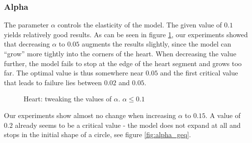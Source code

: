 \subsubsection{Alpha}

The parameter $\alpha$ controls the elasticity of the model. The given value of $0.1$ yields relatively good results. As can be seen in figure \ref{fig:alpha_leq},  our experiments showed that decreasing $\alpha$ to $0.05$ augments the results slightly, since the model can ``grow'' more tightly into the corners of the heart. When decreasing the value further, the model fails to stop at the edge of the heart segment and grows too far. The optimal value is thus somewhere near $0.05$ and the first critical value that leads to failure lies between $0.02$ and $0.05$.
\begin{figure}[!hbt]
\centering   
{}
\caption{Heart: tweaking the values of $ \alpha $. $\alpha \leq 0.1$}
\label{fig:alpha_leq}
\end{figure}

Our experiments show almost no change when increasing $\alpha$ to $0.15$. A value of $0.2$ already seems to be a critical value - the model does not expand at all and stops in the initial shape of a circle, see figure \ref{fig:alpha_geq}.

